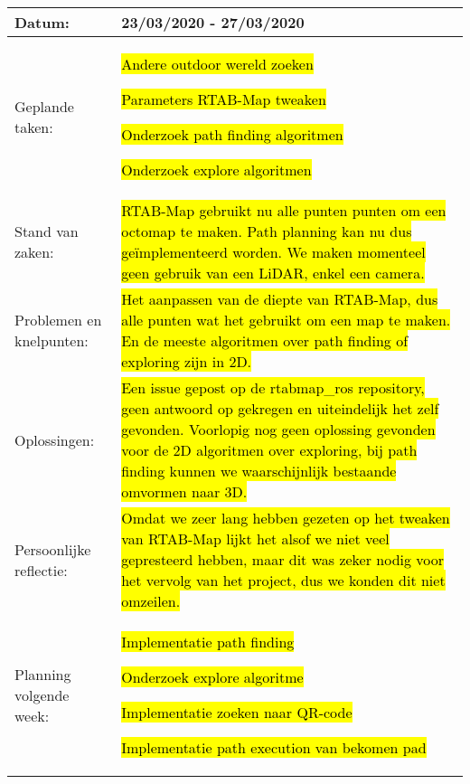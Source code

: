 \begin{tabularx}{\textwidth}{| l | X |}
  \hline
  Datum: & 23/03/2020 - 27/03/2020\\
  \hline
  Geplande taken: &
  \begin{compactitem}
    \item \hl{Andere outdoor wereld zoeken}
    \item \hl{Parameters RTAB-Map tweaken}
    \item \hl{Onderzoek path finding algoritmen}
    \item \hl{Onderzoek explore algoritmen}
  \end{compactitem}\\
  \hline
  Stand van zaken: & \hl{RTAB-Map gebruikt nu alle punten punten om een octomap te maken. Path planning kan nu dus ge\"implementeerd worden. We maken momenteel geen gebruik van een LiDAR, enkel een camera.}\\
  \hline
  Problemen en knelpunten: & \hl{Het aanpassen van de diepte van RTAB-Map, dus alle punten wat het gebruikt om een map te maken. En de meeste algoritmen over path finding of exploring zijn in 2D.}\\
  \hline
  Oplossingen: & \hl{Een issue gepost op de rtabmap\_ros repository, geen antwoord op gekregen en uiteindelijk het zelf gevonden. Voorlopig nog geen oplossing gevonden voor de 2D algoritmen over exploring, bij path finding kunnen we waarschijnlijk bestaande omvormen naar 3D.}\\
  \hline
  Persoonlijke reflectie: & \hl{Omdat we zeer lang hebben gezeten op het tweaken van RTAB-Map lijkt het alsof we niet veel gepresteerd hebben, maar dit was zeker nodig voor het vervolg van het project, dus we konden dit niet omzeilen.}\\
  \hline
  Planning volgende week: &
  \begin{compactitem}
    \item \hl{Implementatie path finding}
    \item \hl{Onderzoek explore algoritme}
    \item \hl{Implementatie zoeken naar QR-code}
    \item \hl{Implementatie path execution van bekomen pad}
  \end{compactitem}\\
  \hline
\end{tabularx}